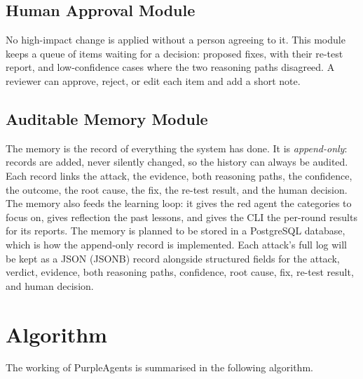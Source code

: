 \subsection{Human Approval Module}
No high-impact change is applied without a person agreeing to it. This module
keeps a queue of items waiting for a decision: proposed fixes, with their re-test
report, and low-confidence cases where the two reasoning paths disagreed. A
reviewer can approve, reject, or edit each item and add a short note.

\subsection{Auditable Memory Module}
The memory is the record of everything the system has done. It is
\emph{append-only}: records are added, never silently changed, so the history can
always be audited. Each record links the attack, the evidence, both reasoning
paths, the confidence, the outcome, the root cause, the fix, the re-test result,
and the human decision. The memory also feeds the learning loop: it gives the
red agent the categories to focus on, gives reflection the past lessons, and
gives the CLI the per-round results for its reports.
The memory is planned to be stored in a PostgreSQL database, which is how the
append-only record is implemented. Each attack's full log will be kept as a JSON
(JSONB) record alongside structured fields for the attack, verdict, evidence,
both reasoning paths, confidence, root cause, fix, re-test result, and human
decision.

\section{Algorithm}

The working of PurpleAgents is summarised in the following algorithm.

